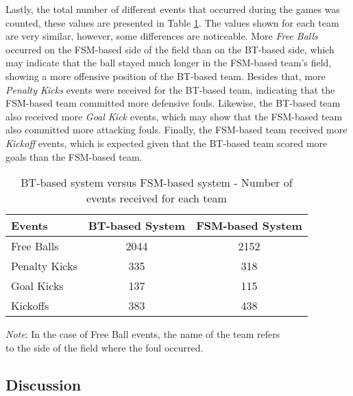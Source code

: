 Lastly, the total number of different events that occurred during the games was counted, these values are presented in Table \ref{tab:fouls_count}. The values shown for each team are very similar, however, some differences are noticeable. More \textit{Free Balls} occurred on the FSM-based side of the field than on the BT-based side, which may indicate that the ball stayed much longer in the FSM-based team's field, showing a more offensive position of the BT-based team. Besides that, more \textit{Penalty Kicks} events were received for the BT-based team, indicating that the FSM-based team committed more defensive fouls. Likewise, the BT-based team also received more \textit{Goal Kick} events, which may show that the FSM-based team also committed more attacking fouls. Finally, the FSM-based team received more \textit{Kickoff} events, which is expected given that the BT-based team scored more goals than the FSM-based team.

\begin{table}[h]
    \begin{minipage}{\columnwidth}
        \centering
        \begin{tabular}{l c c}
            \toprule
            Events        & BT-based System & FSM-based System \\
            \midrule
            Free Balls    & 2044            & 2152             \\
            Penalty Kicks & 335             & 318              \\
            Goal Kicks    & 137             & 115              \\
            Kickoffs      & 383             & 438              \\
            \bottomrule
        \end{tabular}
        \begin{center}
            \footnotesize
            \emph{Note}: In the case of Free Ball events, the name of the team refers \\
            to the side of the field where the foul occurred.
        \end{center}
    \end{minipage}
    \caption{BT-based system versus FSM-based system - Number of events received for each team}
    \label{tab:fouls_count}
\end{table}

\subsection{Discussion}

